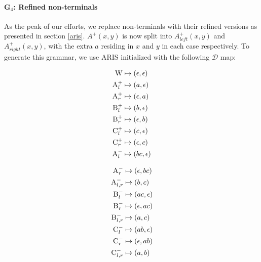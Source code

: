 \documentclass[nonatbib,numbers,10pt]{llncs}
\newcommand\s{\textsc}
\begin{document}
\paragraph{G$_4$: Refined non-terminals}
As the peak of our efforts, we replace non-terminals with their refined versions as presented in section \ref{aris}. $A^{+}(x,y)$ is now split into $A^{+}_{left}(x,y)$ and $A^{+}_{right}(x,y)$, with the extra $a$ residing in $x$ and $y$ in each case respectively. To generate this grammar, we use ARIS initialized with the following $\mathcal{D}$ map:

\begin{minipage}{.2\textwidth}
\begin{align*}
\s{W} &\mapsto (\epsilon, \epsilon) \\
\s{A}^+_{l} &\mapsto (a, \epsilon) \\
\s{A}^+_{r} &\mapsto (\epsilon, a) \\
\s{B}^+_{l} &\mapsto (b, \epsilon) \\
\s{B}^+_{r} &\mapsto (\epsilon, b) \\
\s{C}^+_{l} &\mapsto (c, \epsilon) \\
\s{C}^+_{r} &\mapsto (\epsilon, c) \\
\s{A}^-_{l} &\mapsto (bc, \epsilon) 
\end{align*}
\end{minipage}
\begin{minipage}{.2\textwidth}
\begin{align*}
\s{A}^-_{r} &\mapsto (\epsilon, bc) \\
\s{A}^-_{l, r} &\mapsto (b, c) \\
\s{B}^-_{l} &\mapsto (ac, \epsilon) \\
\s{B}^-_{r} &\mapsto (\epsilon, ac) \\
\s{B}^-_{l, r} &\mapsto (a, c) \\
\s{C}^-_{l} &\mapsto (ab, \epsilon) \\
\s{C}^-_{r} &\mapsto (\epsilon, ab) \\
\s{C}^-_{l, r} &\mapsto (a, b)
\end{align*}
\end{minipage}
\end{document}
